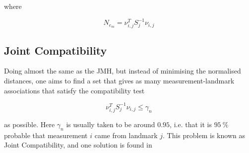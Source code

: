 where 

\begin{equation}
    N_{e_m} = \nu_{i,j}^TS_j^{-1}\nu_{i,j} 
\end{equation}

\subsection{Joint Compatibility}

Doing almost the same as the \gls{JMH}, but instead of minimising the normalised distances, one aims to find a set that gives as many measurement-landmark associations that satisfy the compatibility test

\begin{equation}
    \nu_{i,j}^TS_j^{-1}\nu_{i,j} \leq \gamma_n
\end{equation}

as possible. Here $\gamma_n$ is usually taken to be around $0.95$, i.e. that it is $\SI{95}{\percent}$ probable that measurement $i$ came from landmark $j$. This problem is known as Joint Compatibility, and one solution is found in \cite{Bailey}
